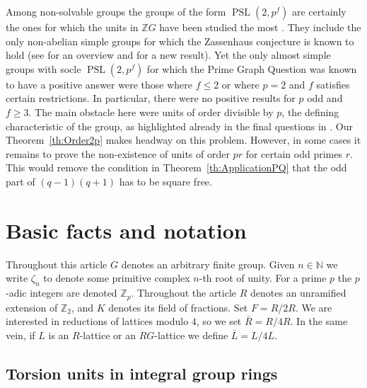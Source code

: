 \documentclass[11pt, a4paper]{amsart}
\theoremstyle{definition}
\theoremstyle{definition}
\newcommand{\Z}{\mathbb Z}
\newcommand{\N}{\mathbb N}
\newcommand{\PSL}{{\operatorname{PSL}}}
\renewcommand{\leq}{\leqslant}
\renewcommand{\geq}{\geqslant}
\begin{document}
Among non-solvable groups the groups of the form $\PSL(2, p^f)$ are certainly the ones for which the units in $\Z G$ have been studied the most \cite{LutharPassi, WagnerDiplom, Bleher95, BleherHissKimmerle95, HertweckBrauer, HertweckA6, HertweckHoefertKimmerle, Gildea13, BaechleMargolisPSL2p3,MargolisPSL, delRioSerrano17, BachleMargolisLattice, BachleMargolis4primaryI, BachleMargolis4primaryII, MargolisdelRioSerrano}. They include the only non-abelian simple groups for which the Zassenhaus conjecture is known to hold (see \cite{MargolisDelRioSurvey} for an overview and \cite[Corollary 1.3]{EiseleMargolisDefect1} for a new result). Yet the only almost simple groups with socle $\PSL(2,p^f)$ for which the Prime Graph Question was known to have a positive answer were those where $f \leq 2$ or where $p=2$ and $f$ satisfies certain restrictions. In particular, there were no positive results for $p$ odd and $f\geq 3$. The main obstacle here were units of order divisible by $p$, the defining characteristic of the group, as highlighted already in the final questions in \cite{HertweckHoefertKimmerle}. Our Theorem~\ref{th:Order2p} makes headway on this problem. However, in some cases it remains to prove the non-existence of units of order $pr$ for certain odd primes $r$. This would remove the condition in Theorem~\ref{th:ApplicationPQ} that the odd part of $(q-1)(q+1)$ has to be square free. 


\section{Basic facts and notation}

Throughout this article $G$ denotes an arbitrary finite group.
Given $n\in \N$ we write $\zeta_n$ to denote some primitive complex $n$-th root of unity. For a prime $p$ the $p$-adic integers are denoted $\mathbb{Z}_p$. Throughout the article $R$ denotes an unramified extension of $\Z_2$, and $K$ denotes its field of fractions. Set $F=R/2R$. We are interested in reductions of lattices modulo $4$, so we set $\bar R=R/4R$. In the same vein, if $L$ is an $R$-lattice or an $RG$-lattice we define $\bar L=L/4L$.


\subsection{Torsion units in integral group rings}\label{section:torsionunits}

\end{document}
